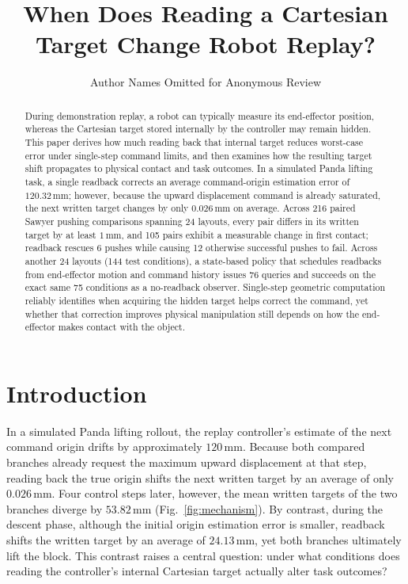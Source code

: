 \documentclass[conference]{IEEEtran}
\begin{document}
\title{When Does Reading a Cartesian Target Change Robot Replay?}

\author{Author Names Omitted for Anonymous Review}

\maketitle

\thispagestyle{empty}\pagestyle{empty}

\begin{abstract}

During demonstration replay, a robot can typically measure its end-effector position, whereas the Cartesian target stored internally by the controller may remain hidden. This paper derives how much reading back that internal target reduces worst-case error under single-step command limits, and then examines how the resulting target shift propagates to physical contact and task outcomes. In a simulated Panda lifting task, a single readback corrects an average command-origin estimation error of $120.32\,\text{mm}$; however, because the upward displacement command is already saturated, the next written target changes by only $0.026\,\text{mm}$ on average. Across 216 paired Sawyer pushing comparisons spanning 24 layouts, every pair differs in its written target by at least $1\,\text{mm}$, and 105 pairs exhibit a measurable change in first contact; readback rescues 6 pushes while causing 12 otherwise successful pushes to fail. Across another 24 layouts (144 test conditions), a state-based policy that schedules readbacks from end-effector motion and command history issues 76 queries and succeeds on the exact same 75 conditions as a no-readback observer. Single-step geometric computation reliably identifies when acquiring the hidden target helps correct the command, yet whether that correction improves physical manipulation still depends on how the end-effector makes contact with the object.

\end{abstract}

\IEEEpeerreviewmaketitle

\section{Introduction}

In a simulated Panda lifting rollout, the replay controller's estimate of the next command origin drifts by approximately $120\,\text{mm}$. Because both compared branches already request the maximum upward displacement at that step, reading back the true origin shifts the next written target by an average of only $0.026\,\text{mm}$. Four control steps later, however, the mean written targets of the two branches diverge by $53.82\,\text{mm}$ (Fig.~\ref{fig:mechanism}). By contrast, during the descent phase, although the initial origin estimation error is smaller, readback shifts the written target by an average of $24.13\,\text{mm}$, yet both branches ultimately lift the block. This contrast raises a central question: under what conditions does reading the controller's internal Cartesian target actually alter task outcomes?
\end{document}
